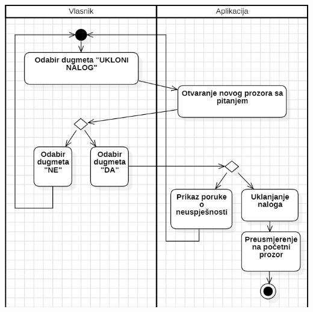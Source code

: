 \documentclass{scrreprt}
\begin{document}
\begin{center}
	\includegraphics[width=14cm]{./img/06.png}
\end{center}

\pagebreak
\end{document}
